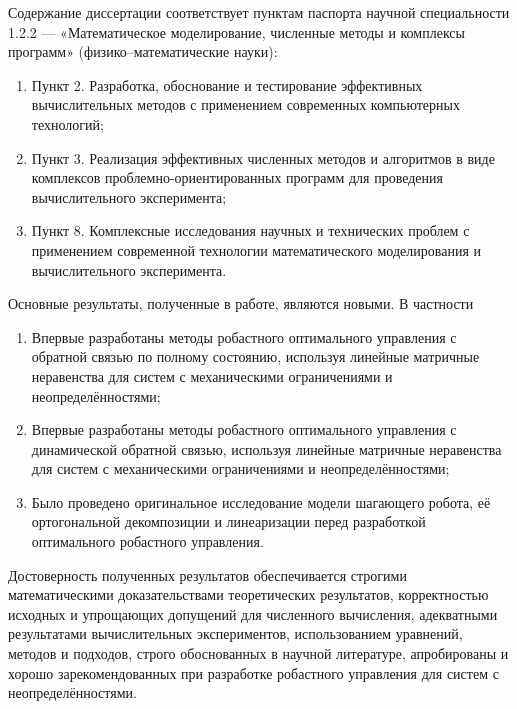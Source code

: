{\compliances} 

Содержание диссертации соответствует пунктам паспорта научной специальности 1.2.2 --- «Математическое моделирование, численные методы и комплексы программ» (физико--математические науки):
\begin{enumerate}[beginpenalty=10000]
	\item Пункт 2. Разработка, обоснование и тестирование эффективных вычислительных методов с применением современных компьютерных технологий;
	\item Пункт 3. Реализация эффективных численных методов и алгоритмов в виде комплексов
	проблемно-ориентированных программ для проведения вычислительного
	эксперимента;
	\item Пункт 8. Комплексные исследования научных и технических проблем с применением
	современной технологии математического моделирования и вычислительного
	эксперимента.
\end{enumerate}

{\novelty}

Основные результаты, полученные в работе, являются новыми. В частности
\begin{enumerate}[beginpenalty=10000] %
	\item Впервые разработаны методы робастного оптимального управления с обратной связью по полному состоянию, используя линейные матричные неравенства для систем с механическими ограничениями и неопределённостями;
	\item Впервые разработаны методы робастного оптимального управления с динамической обратной связью, используя линейные матричные неравенства для систем с механическими ограничениями и неопределённостями;
	\item Было проведено оригинальное исследование модели шагающего робота, её ортогональной декомпозиции и линеаризации перед разработкой оптимального робастного управления.
\end{enumerate}

{\probation}

Достоверность полученных результатов обеспечивается строгими математическими доказательствами теоретических результатов, корректностью исходных и упрощающих допущений для численного вычисления, адекватными результатами вычислительных экспериментов, использованием уравнений, методов и подходов, строго обоснованных в научной литературе, апробированы и хорошо зарекомендованных при разработке робастного управления для систем с неопределённостями. 

